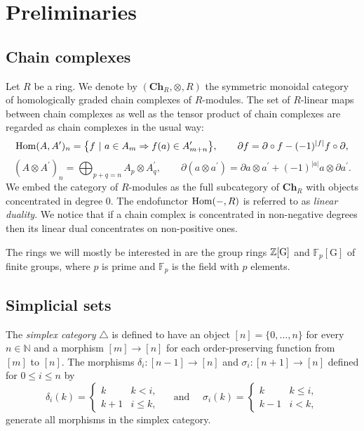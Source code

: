 
\section{Preliminaries} \label{s:preliminaries}

\subsection{Chain complexes} \label{s s:chain cpx}

Let $R$ be a ring.
We denote by $(\mathbf{Ch}_R, \otimes, R)$ the symmetric monoidal category of homologically graded chain complexes of $R$-modules.
The set of $R$-linear maps between chain complexes as well as the tensor product of chain complexes are regarded as chain complexes in the usual way:
\begin{equation*}
\mathrm{Hom}(A, A^\prime)_n = \big\{f \ |\ a \in A_m \Rightarrow f(a) \in A^\prime_{m+n} \big\}, \qquad
\partial f = \partial \circ f - (-1)^{|f|}f \circ \partial,
\end{equation*}
\begin{equation*}
(A \otimes A^\prime)_n = \bigoplus_{p + q = n} A_p \otimes A^\prime_q, \qquad \partial (a \otimes a^\prime) = \partial a \otimes a^\prime + (-1)^{|a|} a \otimes \partial a^\prime.
\end{equation*}
We embed the category of $R$-modules as the full subcategory of $\mathbf{Ch}_R$ with objects concentrated in degree $0$.
The endofunctor $\mathrm{Hom}(-, R)$ is referred to as \textit{linear duality}.
We notice that if a chain complex is concentrated in non-negative degrees then its linear dual concentrates on non-positive ones.

The rings we will mostly be interested in are the group rings $\mathbb{Z}[\mathrm G]$ and $\mathbb{F}_p[\mathrm G]$ of finite groups, where $p$ is prime and $\mathbb{F}_p$ is the field with $p$ elements.

\subsection{Simplicial sets}

The \textit{simplex category} $\triangle$ is defined to have an object $[n] = \{0, \dots, n\}$ for every $n \in \mathbb{N}$ and a morphism $[m] \to [n]$ for each order-preserving function from $[m]$ to $[n]$.
The morphisms $\delta_i \colon [n-1] \to [n]$ and $\sigma_i \colon [n+1] \to [n]$ defined for $0 \leq i \leq n$ by
\begin{equation*}
\delta_i(k) =
\begin{cases} k & k < i, \\ k+1 & i \leq k, \end{cases}
\quad \text{ and } \quad
\sigma_i(k) =
\begin{cases} k & k \leq i, \\ k-1 & i < k, \end{cases}
\end{equation*}
generate all morphisms in the simplex category.

